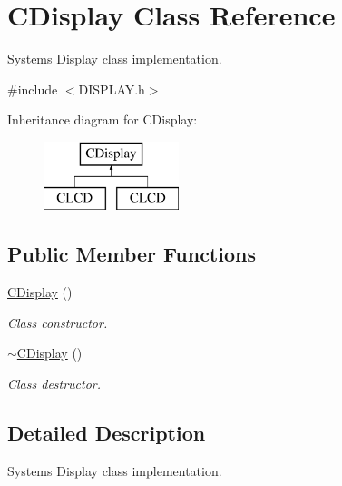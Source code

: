 \hypertarget{class_c_display}{}\section{C\+Display Class Reference}
\label{class_c_display}


System\textquotesingle{}s Display class implementation.  




{\ttfamily \#include $<$D\+I\+S\+P\+L\+A\+Y.\+h$>$}

Inheritance diagram for C\+Display\+:\begin{figure}[H]
\begin{center}
\leavevmode
\includegraphics[height=2.000000cm]{class_c_display}
\end{center}
\end{figure}
\subsection*{Public Member Functions}
\begin{DoxyCompactItemize}
\item 
\mbox{\label{class_c_display_aeab4454cf16b08e1b091c495be595269}} 
\mbox{\hyperlink{class_c_display_aeab4454cf16b08e1b091c495be595269}{C\+Display}} ()
\begin{DoxyCompactList}\small\item\em Class constructor. \end{DoxyCompactList}\item 
\mbox{\label{class_c_display_a15f66b785f2952394d199b9ca58e0f4b}} 
\mbox{\hyperlink{class_c_display_a15f66b785f2952394d199b9ca58e0f4b}{$\sim$\+C\+Display}} ()
\begin{DoxyCompactList}\small\item\em Class destructor. \end{DoxyCompactList}\end{DoxyCompactItemize}


\subsection{Detailed Description}
System\textquotesingle{}s Display class implementation. 

